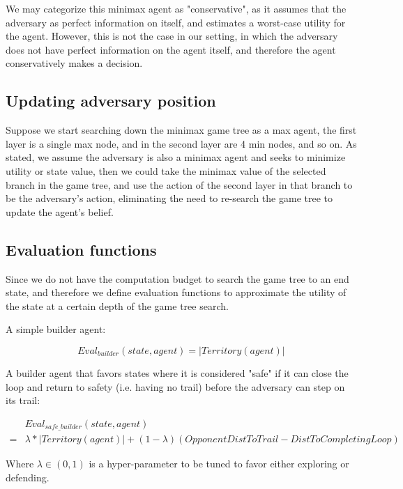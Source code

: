 \documentclass{article}
\begin{document}
We may categorize this minimax agent as "conservative", as it assumes that the adversary as perfect information on itself, and estimates a worst-case utility for the agent. However, this is not the case in our setting, in which the adversary does not have perfect information on the agent itself, and therefore the agent conservatively makes a decision. 

\subsection{Updating adversary position}

Suppose we start searching down the minimax game tree as a max agent, the first layer is a single max node, and in the second layer are 4 min nodes, and so on. As stated, we assume the adversary is also a minimax agent and seeks to minimize utility or state value, then we could take the minimax value of the selected branch in the game tree, and use the action of the second layer in that branch to be the adversary's action, eliminating the need to re-search the game tree to update the agent's belief.

\subsection{Evaluation functions}

Since we do not have the computation budget to search the game tree to an end state, and therefore we define evaluation functions to approximate the utility of the state at a certain depth of the game tree search.

A simple builder agent:

\[Eval_{builder}(state, agent) = |Territory(agent)|\]

A builder agent that favors states where it is considered "safe" if it can close the loop and return to safety (i.e. having no trail) before the adversary can step on its trail:

\begin{equation*}
\begin{split}
    &Eval_{safe\_builder}(state, agent) \\
    =& \lambda * |Territory(agent)| + (1-\lambda)(OpponentDistToTrail - DistToCompletingLoop)
\end{split}
\end{equation*}

Where $\lambda \in (0,1)$ is a hyper-parameter to be tuned to favor either exploring or defending.
\end{document}
